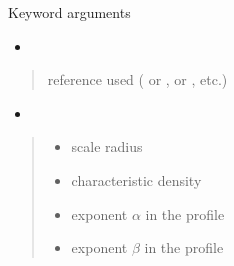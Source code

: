 \documentclass[letterpaper,10pt,english]{sphinxmanual}
\begin{document}
\begin{fulllineitems}
\begin{quote}
\begin{description}
\end{description}\end{quote}

\sphinxAtStartPar
Keyword arguments
\begin{itemize}
\item {} 
\sphinxAtStartPar
{}

\end{itemize}
\begin{quote}\begin{description}
\sphinxAtStartPar
{} \textendash{} reference used ( or \sphinxcode{\sphinxupquote{\textquotesingle{}1309.2641\textquotesingle{}}},  or \sphinxcode{\sphinxupquote{\textquotesingle{}1408.0002\textquotesingle{}}}, etc.)

\end{description}\end{quote}
\begin{itemize}
\item {} 
\sphinxAtStartPar
{}

\end{itemize}
\begin{quote}\begin{description}
\begin{itemize}
\item {} 
\sphinxAtStartPar
{} \textendash{} scale radius

\item {} 
\sphinxAtStartPar
{} \textendash{} characteristic density

\item {} 
\sphinxAtStartPar
{} \textendash{} exponent \(\alpha\) in the {\hyperref[\detokenize{diffsph.profiles:diffsph.profiles.templates.hdz}]{}} profile

\item {} 
\sphinxAtStartPar
{} \textendash{} exponent \(\beta\) in the {\hyperref[\detokenize{diffsph.profiles:diffsph.profiles.templates.hdz}]{}} profile


\end{itemize}
\end{description}
\end{quote}
\end{fulllineitems}
\end{document}
